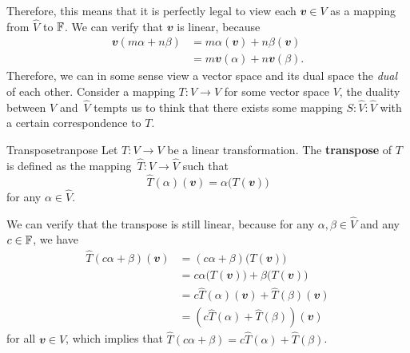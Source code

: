 \documentclass[math, code]{amznotes}
\theoremstyle{remark}
\begin{document}
Therefore, this means that it is perfectly legal to view each $\mathbfit{v} \in V$ as a mapping from $\widehat{V}$ to $\mathbb{F}$. We can verify that $\mathbfit{v}$ is linear, because
\begin{align*}
    \mathbfit{v}(m\alpha + n\beta) & = m\alpha(\mathbfit{v}) + n\beta(\mathbfit{v}) \\
    & = m\mathbfit{v}(\alpha) + n\mathbfit{v}(\beta).
\end{align*}
Therefore, we can in some sense view a vector space and its dual space the \textit{dual} of each other. Consider a mapping $T \colon V \to V$ for some vector space $V$, the duality between $V$ and~$\widehat{V}$ tempts us to think that there exists some mapping $S \colon \widehat{V} \colon \widehat{V}$ with a certain correspondence to $T$.
\begin{dfnbox}{Transpose}{tranpose}
    Let $T \colon V \to V$ be a linear transformation. The {\color{red} \textbf{transpose}} of $T$ is defined as the mapping~$\widehat{T} \colon \widehat{V} \to \widehat{V}$ such that 
    \begin{equation*}
        \widehat{T}(\alpha)(\mathbfit{v}) = \alpha\bigl(T(\mathbfit{v})\bigr)
    \end{equation*}
    for any $\alpha \in \widehat{V}$. 
\end{dfnbox}
We can verify that the transpose is still linear, because for any $\alpha, \beta \in \widehat{V}$ and any $c \in \mathbb{F}$, we have 
\begin{align*}
    \widehat{T}(c\alpha + \beta)(\mathbfit{v}) & = (c\alpha + \beta)\bigl(T(\mathbfit{v})\bigr) \\
    & = c\alpha\bigl(T(\mathbfit{v})\bigr) + \beta\bigl(T(\mathbfit{v})\bigr) \\
    & = c\widehat{T}(\alpha)(\mathbfit{v}) + \widehat{T}(\beta)(\mathbfit{v}) \\
    & = \left(c\widehat{T}(\alpha) + \widehat{T}(\beta)\right)(\mathbfit{v})
\end{align*}
for all $\mathbfit{v} \in V$, which implies that $\widehat{T}(c\alpha + \beta) = c\widehat{T}(\alpha) + \widehat{T}(\beta)$.
\end{document}

